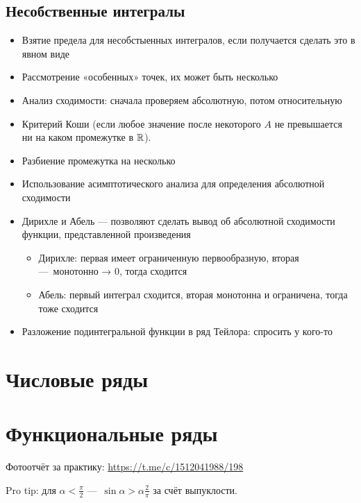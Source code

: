\documentclass[12pt, a4paper]{article}
\begin{document}
    
  \subsection{Несобственные интегралы}

  \begin{itemize}
    \item Взятие предела для несобстыенных интегралов, если получается сделать это в явном виде
    \item Рассмотрение «особенных» точек, их может быть несколько
    \item Анализ сходимости: сначала проверяем абсолютную, потом относительную
    \item Критерий Коши (если любое значение после некоторого $A$ не превышается ни на каком промежутке в ${\mathbb{R}}$).
    \item Разбиение промежутка на несколько
    \item Использование асимптотического анализа для определения абсолютной сходимости
    \item Дирихле и Абель — позволяют сделать вывод об абсолютной сходимости функции, представленной произведения
      \begin{itemize}
        \item Дирихле: первая имеет ограниченную первообразную, вторая — монотонно → 0, тогда сходится
        \item Абель: первый интеграл сходится, вторая монотонна и ограничена, тогда тоже сходится
      \end{itemize}
    \item Разложение подинтегральной функции в ряд Тейлора: спросить у кого-то
  \end{itemize}


\section{Числовые ряды}

  

\section{Функциональные ряды}


Фотоотчёт за практику: \url{https://t.me/c/1512041988/198}

Pro tip: для $\alpha < \frac{\pi}{2}$ — $\sin \alpha > \alpha \frac{2}{\pi}$ за счёт выпуклости.
\end{document}
